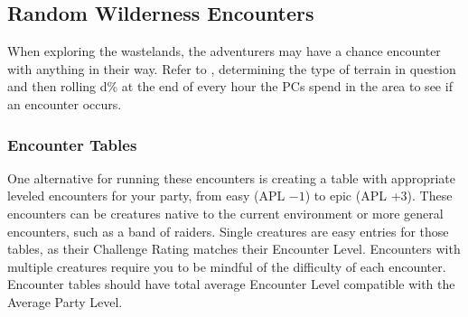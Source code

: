 \subsection{Random Wilderness Encounters}
When exploring the wastelands, the adventurers may have a chance encounter with anything in their way. Refer to , determining the type of terrain in question and then rolling d\% at the end of every hour the PCs spend in the area to see if an encounter occurs.


\subsubsection{Encounter Tables}
One alternative for running these encounters is creating a table with appropriate leveled encounters for your party, from easy (APL $-1$) to epic (APL +3). These encounters can be creatures native to the current environment or more general encounters, such as a band of raiders. Single creatures are easy entries for those tables, as their Challenge Rating matches their Encounter Level. Encounters with multiple creatures require you to be mindful of the difficulty of each encounter. Encounter tables should have total average Encounter Level compatible with the Average Party Level.

